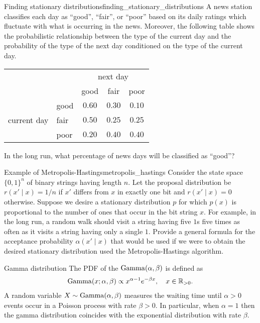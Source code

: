 \begin{nexercise}{Finding stationary distributions}{finding_stationary_distributions}
  A news station classifies each day as ``good'', ``fair'', or ``poor'' based on its daily ratings which fluctuate with what is occurring in the news.
  Moreover, the following table shows the probabilistic relationship between the type of the current day and the probability of the type of the next day conditioned on the type of the current day.

  \vspace{5pt}
  \begin{center}
    \begin{tabular}{ll|ccc}
      \toprule
      && \multicolumn{3}{c}{next day} \\
      && good & fair & poor \\
      \midrule
      \multirow{3}{*}{current day} & good & $0.60$ & $0.30$ & $0.10$ \\
      & fair & $0.50$ & $0.25$ & $0.25$ \\
      & poor & $0.20$ & $0.40$ & $0.40$ \\
      \bottomrule
    \end{tabular}
  \end{center}
  \vspace{5pt}

  In the long run, what percentage of news days will be classified as ``good''?
\end{nexercise}

\begin{nexercise}{Example of Metropolis-Hastings}{metropolis_hastings}
  Consider the state space $\{0,1\}^n$ of binary strings having length $n$.
  Let the proposal distribution be $r(x' \mid x) = 1/n$ if $x'$ differs from $x$ in exactly one bit and $r(x' \mid x) = 0$ otherwise.
  Suppose we desire a stationary distribution $p$ for which $p(x)$ is proportional to the number of ones that occur in the bit string $x$.
  For example, in the long run, a random walk should visit a string having five $1$s five times as often as it visits a string having only a single $1$.
  Provide a general formula for the acceptance probability $\alpha(x' \mid x)$ that would be used if we were to obtain the desired stationary distribution used the Metropolis-Hastings algorithm.
\end{nexercise}

\begin{marginbox}[30\baselineskip]{Gamma distribution}
  The PDF of the  $\GammaDistr{\alpha}{\beta}$ is defined as \begin{align*}
    \GammaDistr[x]{\alpha}{\beta} \propto x^{\alpha-1} e^{- \beta x}, \quad x \in \R_{>0}.
  \end{align*}
  A random variable $X \sim \GammaDistr{\alpha}{\beta}$ measures the waiting time until $\alpha > 0$ events occur in a Poisson process with rate $\beta > 0$.
  In particular, when $\alpha = 1$ then the gamma distribution coincides with the exponential distribution with rate $\beta$.
\end{marginbox}

